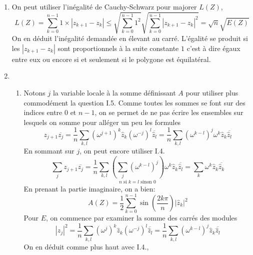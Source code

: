 \begin{enumerate}
 \item On peut utiliser l'inégalité de Cauchy-Schwarz pour majorer $L(Z)$,
\begin{displaymath}
 L(Z)=
\sum_{k=0}^{n-1}1\times |z_{k+1}-z_k|
\leq \sqrt{\sum_{k=0}^{n-1}1^2}\sqrt{\sum_{k=0}^{n-1}|z_{k+1}-z_k|^2}
 = \sqrt{n}\sqrt{E(Z)}
\end{displaymath}
On en déduit l'inégalité demandée en élevant au carré.\newline
L'égalité se produit si les $|z_{k+1}-z_k|$ sont proportionnels à la suite constante $1$ c'est à dire égaux entre eux ou encore si et seulement si le polygone est équilatéral.
 \item 
\begin{enumerate}
 \item Notons $j$ la variable locale à la somme définissant $A$ pour utiliser plus commodément la question I.5. Comme toutes les sommes se font sur des indices entre $0$ et $n-1$, on se permet de ne pas écrire les ensembles sur lesquels on somme pour alléger un peu les formules
\begin{displaymath}
 z_{j+1}\overline{z_j} = \frac{1}{n}\sum_{k,l}
\left(\omega^{j+1} \right)^k\widehat{z}_k
\left(\omega^{-j} \right)^l\overline{\widehat{z}_l} 
=\frac{1}{n}\sum_{k,l}
\left(\omega^{k-l} \right)^j\omega^k \widehat{z}_k \overline{\widehat{z}_l} 
\end{displaymath}
En sommant sur $j$, on peut encore utiliser I.4.
\begin{displaymath}
\sum_{j} z_{j+1}\overline{z_j} 
= \frac{1}{n}\sum_{k,l}
\underset{n \text{ si } k=l\text{ sinon }0}{
  \left( 
    \sum_{j} \left(\omega^{k-l} \right)^j
  \right)
} 
\omega^k \widehat{z}_k \overline{\widehat{z}_l}
=\sum_{k} \omega^k \widehat{z}_k \overline{\widehat{z}_k}
\end{displaymath}
En prenant la partie imaginaire, on a bien:
\begin{displaymath}
 A(Z) = \frac{1}{2}\sum_{k=0}^{n-1}\sin\left(\frac{2k\pi}{n} \right)|\widehat{z}_k|^2 
\end{displaymath}
Pour $E$, on commence par examiner la somme des carrés des modules
\begin{displaymath}
 |z_j|^2 = \frac{1}{n}\sum_{k,l}
\left(\omega^{j} \right)^k\widehat{z}_k
\left(\omega^{-j} \right)^l\overline{\widehat{z}_l} 
= \frac{1}{n}\sum_{k,l}
\left(\omega^{k-l} \right)^j \widehat{z}_k \overline{\widehat{z}_l}
\end{displaymath}
On en déduit comme plus haut avec I.4.,
\begin{displaymath}

\end{displaymath}
\end{enumerate}
\end{enumerate}

